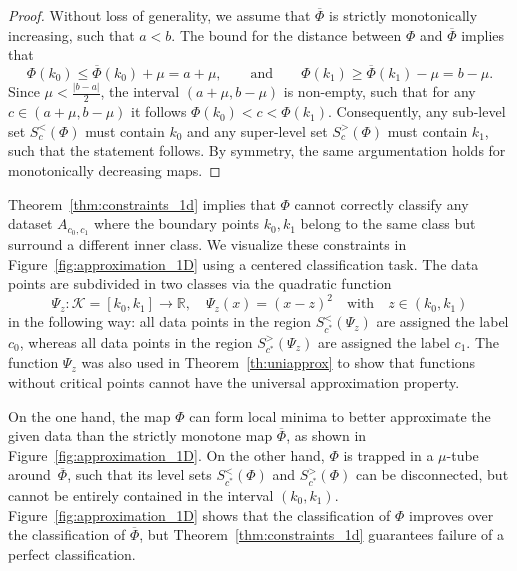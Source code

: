 \documentclass[10pt]{article}
\theoremstyle{definition}
\numberwithin{equation}{section}
\newcommand\abs[1]{\left\lvert#1\right\rvert}
\newcommand{\R}{\mathbb{R}}
\begin{document}
\begin{proof}
    Without loss of generality, we assume that $\overline{\Phi}$ is strictly monotonically increasing, such that $a < b$. The bound for the distance between $\Phi$ and $\overline{\Phi}$ implies that
    \begin{equation*}
        \Phi(k_0) \leq \overline{\Phi}(k_0) + \mu = a + \mu, \qquad \text{and} \qquad 
        \Phi(k_1) \geq \overline{\Phi}(k_1) - \mu = b - \mu.
    \end{equation*}
    Since $\mu < \frac{\abs{b-a}}{2}$, the interval $(a+\mu, b-\mu)$ is non-empty, such that for any $c \in (a+\mu, b-\mu)$ it follows $\Phi(k_0) < c < \Phi(k_1)$. Consequently, any sub-level set $S_c^{<}(\Phi)$ must contain $k_0$ and any super-level set $S_c^{>}(\Phi)$ must contain $k_1$, such that the statement follows. By symmetry, the same argumentation holds for monotonically decreasing maps.
\end{proof}

Theorem~\ref{thm:constraints_1d} implies that $\Phi$ cannot correctly classify any dataset $A_{c_0,c_1}$ where the boundary points $k_0, k_1$ belong to the same class but surround a different inner class. We visualize these constraints in Figure~\ref{fig:approximation_1D} using a centered classification task. The data points are subdivided in two classes via the quadratic function
\begin{equation*}
    \Psi_z: \mathcal{K} = [k_0,k_1]\rightarrow \R, \quad \Psi_z(x) = (x-z)^2 \quad \text{with} \quad z\in (k_0,k_1)
\end{equation*}
in the following way: all data points in the region $S_{c^\ast}^{<}(\Psi_z)$ are assigned the label $c_0$, whereas all data points in the region $S_{c^\ast}^{>}(\Psi_z)$ are assigned the label $c_1$. The function $\Psi_z$ was also used in Theorem~\ref{th:uniapprox} to show that functions without critical points cannot have the universal approximation property. 

On the one hand, the map $\Phi$ can form local minima to better approximate the given data than the strictly monotone map $\overline{\Phi}$, as shown in Figure~\ref{fig:approximation_1D}. On the other hand, $\Phi$ is trapped in a $\mu$-tube around~$\overline{\Phi}$, such that its level sets $S_{c^\ast}^{<}(\Phi)$ and $S_{c^\ast}^{>}(\Phi)$ can be disconnected, but cannot be entirely contained in the interval $(k_0,k_1)$. Figure~\ref{fig:approximation_1D} shows that the classification of $\Phi$ improves over the classification of $\overline{\Phi}$, but Theorem~\ref{thm:constraints_1d} guarantees failure of a perfect classification. 
\end{document}
